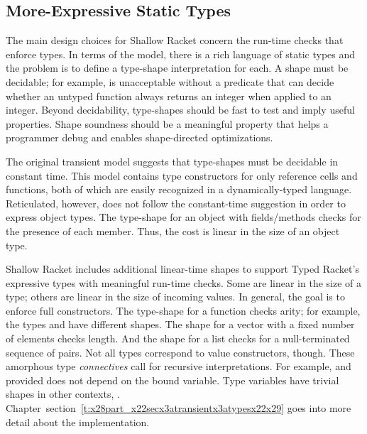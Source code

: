 \documentclass[ twoside,open=right,titlepage,numbers=noenddot,headinclude,%
                footinclude=true,cleardoublepage=empty,abstract=off,
                BCOR=5mm,paper=a4,fontsize=11pt,%
                ngerman,american,%
                parts,pdfspacing]{scrreprt}
\newcommand{\SecRef}[2]{section~#1}
\newcommand{\SecRefLocal}[3]{\hyperref[#1]{\SecRef{#2}{#3}}}
\newcommand{\Ssubsubsection}[2]{\subsubsection[#1]{#2}}
\renewcommand{\Ssubsubsection}[2]{\subsection[#1]{#2}}
\renewcommand{\SecRefLocal}[3]{section~\ref{#1}}
\begin{document}
\Ssubsubsection{More{-}Expressive Static Types}{More{-}Expressive Static Types}\label{t:x28part_x22secx3atransientx3atheoryx3atypesx22x29}

The main design choices for Shallow Racket concern the run{-}time checks
 that enforce types.
In terms of the model, there is a rich language \relax{$\stype$} of static types
 and the problem is to define a type{-}shape interpretation \relax{$\tagof{\stype}$} for
 each.
A shape must be decidable; for example,
 \relax{$\tagof{\tfun{\tint}{\tint}} = \tfun{\tint}{\tint}$} is unacceptable
 without a predicate that can decide whether an untyped function always
 returns an integer when applied to an integer.
Beyond decidability, type{-}shapes should be fast to test and imply useful
 properties.
Shape soundness should be a meaningful property that helps a programmer debug
 and enables shape{-}directed optimizations.

The original transient model suggests that type{-}shapes must be decidable
 in constant time.
This model contains type constructors for only reference cells and functions,
 both of which are easily recognized in a dynamically{-}typed language.
Reticulated, however, does not follow the constant{-}time suggestion in order
 to express object types.
The type{-}shape for an object with  fields/methods checks for the presence
 of each member.
Thus, the cost is linear in the size of an object type.

Shallow Racket includes additional linear{-}time shapes to support
 Typed Racket{'}s expressive types with meaningful run{-}time checks.
Some are linear in the size of a type; others are linear in the size of incoming values.
In general, the goal is to enforce full constructors.
The type{-}shape for a function checks arity; for example,
 the types \relax{$(\tfun{\tint}{\tnat})$} and \relax{$(\tfun{\tint\,\tint}{\tnat})$}
 have different shapes.
The shape for a vector with a fixed number of elements checks length.
And the shape for a list checks for a null{-}terminated sequence of pairs.
Not all types correspond to value constructors, though.
These amorphous type \emph{connectives} call for
 recursive interpretations.
For example, 
 and 
 provided  does not depend on the bound variable.
Type variables have trivial shapes in other contexts, .
Chapter~\SecRefLocal{t:x28part_x22secx3atransientx3atypesx22x29}{5.3.1}{Types to Shapes} goes into more detail about the implementation.
\end{document}
